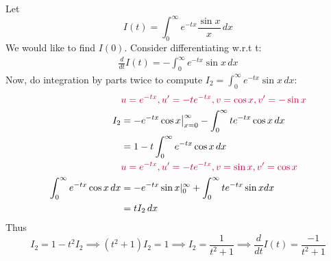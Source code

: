 \documentclass{homework}
\begin{document}
                                                                        \begin{solution}
                                                                        Let 
                                                                        \[
                                                                        I(t) = \int_0^\infty e^{-tx}\frac{\sin x}{x}\, dx
                                                                        \]
                                                                        We would like to find $I(0)$. Consider differentiating w.r.t t:
                                                                        \begin{align*}
                                                                        \frac{d}{dt}I(t) = -\int_0^\infty e^{-tx}\sin x\, dx
                                                                        \end{align*}
                                                                        Now, do integration by parts twice to compute \(I_2 = \int_0^\infty e^{-tx}\sin x\, dx\):
                                                                        \begin{align*}
                                                                        &\color{purple} u=e^{-tx}, u'=-te^{-tx}, v = \cos x, v' = -\sin x\\
                                                                        I_2 &= -e^{-tx}\cos x\big|_{x=0}^\infty - \int_0^\infty te^{-tx}\cos x\, dx\\
                                                                        &= 1 - t\int_0^\infty e^{-tx}\cos x\, dx\\
                                                                        &\color{purple} u=e^{-tx}, u'=-te^{-tx}, v = \sin x, v' = \cos x\\
                                                                        \int_0^\infty e^{-tx}\cos x\, dx &= -e^{-tx}\sin x|_{0}^{\infty} + \int_0^\infty te^{-tx}\sin x dx\\
                                                                        &= tI_2\, dx
                                                                        \end{align*}
                                                                        Thus 
                                                                        \[
                                                                        I_2 = 1 - t^2I_2 \implies (t^2+1)I_2 = 1 \implies I_2 = \frac{1}{t^2+1} \implies \frac{d}{dt}I(t) = \frac{-1}{t^2+1}
\]
\end{solution}
\end{document}
